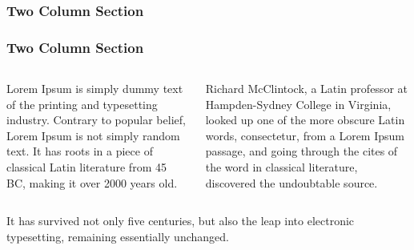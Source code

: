 \documentclass[hyperref={bookmarks=false},aspectratio=169, usenames,dvipsnames, hideothersubsections]{beamer}
\begin{document}
\begin{frame}
\frametitle{Two Column Section}

\frametitle{Two Column Section}

\begin{columns}

Lorem Ipsum is simply dummy text of the printing and typesetting industry. Contrary to popular belief, Lorem Ipsum is not simply random text. It has roots in a piece of classical Latin literature from 45 BC, making it over 2000 years old. 

Richard McClintock, a Latin professor at Hampden-Sydney College in Virginia, looked up one of the more obscure Latin words, consectetur, from a Lorem Ipsum passage, and going through the cites of the word in classical literature, discovered the undoubtable source.
\end{columns}

It has survived not only five centuries, but also the leap into electronic typesetting, remaining essentially unchanged.

\end{frame}
\end{document}
